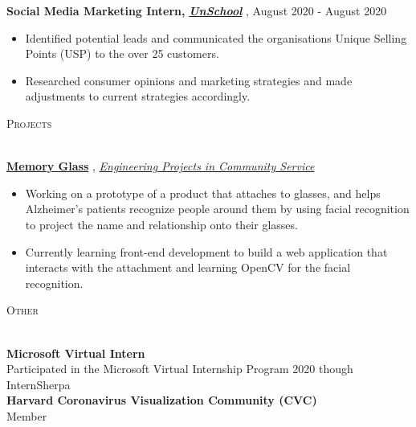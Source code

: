 \documentclass[a4paper]{article}
\newcommand{\lineunder} {
    \vspace*{-8pt} \\
    \hspace*{-18pt} \hrulefill \\
}
\newcommand{\header} [1] {
    {\hspace*{-15pt}\vspace*{3pt} \textsc{#1}}
    \vspace*{-6pt} \lineunder
}
\begin{document}
\textbf{Social Media Marketing Intern, }\textbf\textit{{\href{https://www.unschool.in/}{UnSchool}} \faExternalLink},  \hfill August 2020 - August 2020\\
\vspace{0mm}
\vspace{-1mm}
\begin{itemize} \itemsep 1pt
	\item Identified potential leads and communicated the organisation\textquotesingle{}s Unique Selling Points (USP) to the over 25 customers.
	\item Researched consumer opinions and marketing strategies and made adjustments to current strategies accordingly.
\end{itemize}

\vspace{-4mm}
\begin{center}
    \header{Projects}
\end{center}

\href{https://www.memoryglass.net}{\textbf{Memory Glass}} \faExternalLink, \href{https://epics.engineering.asu.edu/}{\textit{Engineering Projects in Community Service}} \faExternalLink
\begin{itemize}
    \item Working on a prototype of a product that attaches to glasses, and helps Alzheimer's patients recognize people around them by using facial recognition to project the name and relationship onto their glasses. 
    \item Currently learning front-end development to build a web application that interacts with the attachment and learning OpenCV for the facial recognition. 
\end{itemize}
\vspace{-2mm}

    
	 
\vspace{2mm}

\vspace{-2mm}
\begin{center}
    \header{Other}
\end{center}
{\textbf{Microsoft Virtual Intern}}\\
Participated in the Microsoft Virtual Internship Program 2020 though InternSherpa\\
\vspace{2mm}
\textbf{Harvard Coronavirus Visualization Community (CVC)} \\
Member
\end{document}
